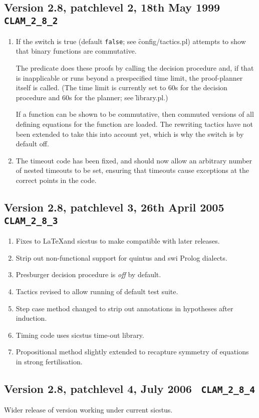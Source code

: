 \subsection {Version 2.8, patchlevel 2, 18th May 1999 {\tt
    CLAM\_2\_8\_2}}
\begin{enumerate}
        \item  If the switch  is true (default {\tt false}; see
          \f{config/tactics.pl}) \clam attempts to show that binary functions are
          commutative.  

          The predicate  does these proofs by calling the
          decision procedure and, if that is inapplicable or runs
          beyond a prespecified time limit, the proof-planner itself
          is called.  (The time limit is currently set to 60s for the
          decision procedure and 60s for the planner; see \f{library.pl}.)
          
          If a function can be shown to be commutative, then commuted
          versions of all defining equations for the function are
          loaded. The rewriting tactics have not been extended to take
          this into account yet, which is why the switch is by default off.

        \item The timeout code has been fixed, and should now allow an
          arbitrary number of nested timeouts to be set, ensuring that
          timeouts cause exceptions at the correct points in the code. 
        \end{enumerate}

\subsection {Version 2.8, patchlevel 3, 26th April 2005 {\tt
    CLAM\_2\_8\_3}}
\begin{enumerate}
   \item
     Fixes to \LaTeX and sicstus to make compatible with later releases.
   \item
     Strip out non-functional support for quintus and swi Prolog dialects.
   \item
     Presburger decision procedure is \emph{off} by default.
   \item
     Tactics revised to allow running of default test suite.
   \item
     Step case method changed to strip out annotations in hypotheses
     after induction.
   \item
     Timing code uses sicstus time-out library.
   \item
     Propositional method slightly extended to recapture 
     symmetry of equations in strong fertilisation. 
\end{enumerate}

\subsection {Version 2.8, patchlevel 4, July 2006 {\tt
    CLAM\_2\_8\_4}}

Wider release of version working under current sicstus.


